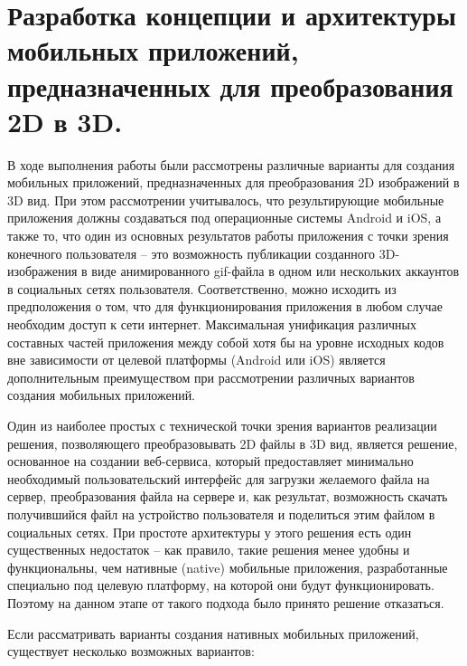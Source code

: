 \section{Разработка концепции и архитектуры мобильных приложений, предназначенных для преобразования 2D в 3D.}
В ходе выполнения работы были рассмотрены различные варианты для создания мобильных приложений, предназначенных для преобразования 2D изображений в 3D вид. При этом рассмотрении учитывалось, что результирующие мобильные приложения должны создаваться под операционные системы Android и iOS, а также то, что один из основных результатов работы приложения с точки зрения конечного пользователя – это возможность публикации созданного 3D-изображения в виде анимированного gif-файла в одном или нескольких аккаунтов в социальных сетях пользователя. Соответственно, можно исходить из предположения о том, что для функционирования приложения в любом случае необходим доступ к сети интернет. Максимальная унификация различных составных частей приложения между собой хотя бы на уровне исходных кодов вне зависимости от целевой платформы (Android или iOS) является дополнительным преимуществом при рассмотрении различных вариантов создания мобильных приложений.

Один из наиболее простых с технической точки зрения вариантов реализации решения, позволяющего преобразовывать 2D файлы в 3D вид, является решение, основанное на создании веб-сервиса, который предоставляет минимально необходимый пользовательский интерфейс для загрузки желаемого файла на сервер, преобразования файла на сервере и, как результат, возможность скачать получившийся файл на устройство пользователя и поделиться этим файлом в социальных сетях. При простоте архитектуры у этого решения есть один существенных недостаток – как правило, такие решения менее удобны и функциональны, чем нативные (native) мобильные приложения, разработанные специально под целевую платформу, на которой они будут функционировать. Поэтому на данном этапе от такого подхода было принято решение отказаться.

Если рассматривать варианты создания нативных мобильных приложений, существует несколько возможных вариантов:

